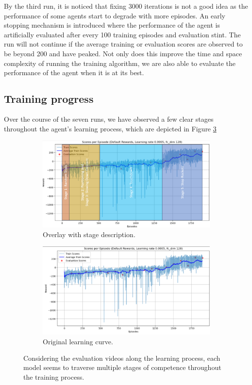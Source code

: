 \documentclass[a4paper, 11pt]{article}
\begin{document}
	By the third run, it is noticed that fixing 3000 iterations is not a good idea as the performance of some agents start to degrade with more episodes. An early stopping mechanism is introduced where the performance of the agent is artificially evaluated after every 100 training episodes and evaluation stint. The run will not continue if the average training or evaluation scores are observed to be beyond 200 and have peaked. Not only does this improve the time and space complexity of running the training algorithm, we are also able to evaluate the performance of the agent when it is at its best.
	\subsection{Training progress}
	Over the course of the seven runs, we have observed a few clear stages throughout the agent’s learning process, which are depicted in Figure \ref{fig:pg_stages}
	
	\begin{figure}[ht]
		\begin{center}
			\begin{subfigure}{0.48\textwidth}
				\includegraphics[width=\linewidth]{data_policygradient/stages.png}
				\caption{Overlay with stage description.}
				\label{fig:pg_stage}
			\end{subfigure}\hfill 
			\begin{subfigure}{0.48\textwidth}
				\includegraphics[width=\linewidth]{data_policygradient/stages_background.PNG}
				\caption{Original learning curve.}
				\label{fig:pg_stagetemplate}
			\end{subfigure}
		\end{center}
		\caption{Considering the evaluation videos along the learning process, each model seems to traverse multiple stages of competence throughout the training process.}
		\label{fig:pg_stages}
	\end{figure}
	
\end{document}
